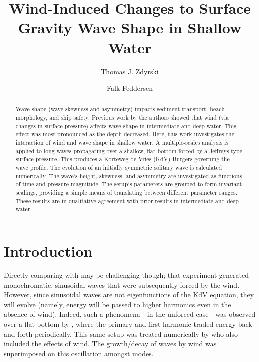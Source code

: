 \documentclass{jfm}
\title{Wind-Induced Changes to Surface Gravity Wave Shape in Shallow Water}
\author{Thomas J. Zdyrski \and Falk Feddersen}
\let\Oldsection\section
\renewcommand{\section}{\FloatBarrier\Oldsection}
\begin{document}
\maketitle

\begin{abstract}
Wave shape (\eg wave skewness and asymmetry) impacts sediment transport,
beach morphology, and ship safety.
Previous work by the authors showed that wind (via changes in surface
pressure) affects wave shape in intermediate and deep water.
This effect was most pronounced as the depth decreased.
Here, this work investigates the interaction of wind and wave shape in
shallow water.
A multiple-scales analysis is applied to long waves propagating over a
shallow, flat bottom forced by a Jeffreys-type surface pressure.
This produces a Korteweg-de Vries (KdV)-Burgers governing the wave
profile.
The evolution of an initially symmetric solitary wave is calculated
numerically.
The wave's height, skewness, and asymmetry are investigated as functions
of time and pressure magnitude.
The setup's parameters are grouped to form invariant scalings,
providing a simple means of translating between different parameter
ranges.
These results are in qualitative agreement with prior results in
intermediate and deep water.
\end{abstract}

\section{Introduction}
Directly comparing with \citet{feddersen2005wind} may be challenging
though; that experiment generated monochromatic, sinusoidal waves that
were subsequently forced by the wind.
However, since sinusoidal waves are not eigenfunctions of the KdV
equation, they will evolve (namely, energy will be passed to higher
harmonics even in the absence of wind).
Indeed, such a phenomena---in the unforced case---was observed over a
flat bottom by \citet{elgar1990recurrence,chapalain1992observed},
where the primary and first harmonic traded energy back and forth
periodically.
This same setup was treated numerically by \citet{liu2016modeling}
who also included the effects of wind.
The growth/decay of waves by wind was superimposed on this oscillation
amongst modes.
\end{document}
